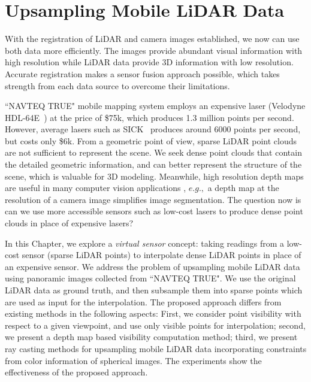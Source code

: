 \chapter{Upsampling Mobile LiDAR Data}

With the registration of LiDAR and camera images established, we now can use both data more efficiently. The images provide abundant visual information with high resolution while LiDAR data provide 3D information with low resolution. Accurate registration makes a sensor fusion approach possible, which takes strength from each data source to overcome their limitations.

``NAVTEQ TRUE" mobile mapping system employs an expensive laser (Velodyne HDL-64E~\cite {velodyne-url}) at the price of \$75k, which produces 1.3 million points per second. However, average lasers such as SICK~\cite {sick-url} produces around 6000 points per second, but costs only \$6k. From a geometric point of view, sparse LiDAR point clouds are not sufficient to represent the scene. We seek dense point clouds that contain the detailed geometric information, and can better represent the structure of the scene, which is valuable for 3D modeling. Meanwhile, high resolution depth maps are useful in many computer vision applications \cite{Dolson10}, $e.g.,$ a depth map at the resolution of a camera image simplifies image segmentation. The question now is can we use more accessible sensors such as low-cost lasers to produce dense point clouds in place of expensive lasers? 

In this Chapter, we explore a {\it virtual sensor} concept: taking readings from a low-cost sensor (sparse LiDAR points) to interpolate dense LiDAR points in place of an expensive sensor. We address the problem of upsampling mobile LiDAR data using panoramic images collected from ``NAVTEQ TRUE". We use the original LiDAR data as ground truth, and then subsample them into sparse points which are used as input for the interpolation. The proposed approach differs from existing methods \cite{Torres-Mendez02, Diebel05anapplication, Andreasson06, yang07, Garro09, Dolson10} in the following aspects: First, we consider point visibility with respect to a given viewpoint, and use only visible points for interpolation; second, we present a depth map based visibility computation method; third, we present ray casting methods for upsampling mobile LiDAR data incorporating constraints from color information of spherical images. The experiments show the effectiveness of the proposed approach.


